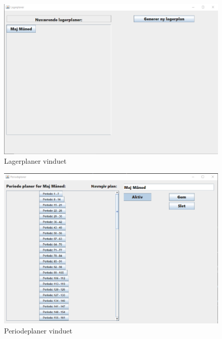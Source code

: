 \begin{figure}
    \centering
    \includegraphics[width=0.7\hsize]{figures/implementation/UI/lagerplaner.png}
    \caption{Lagerplaner vinduet}
    \label{fig:lagerplaner}
\end{figure}

\begin{figure}
    \centering
    \includegraphics[width=0.7\hsize]{figures/implementation/UI/periodeplaner.png}
    \caption{Periodeplaner vinduet}
    \label{fig:periodeplaner}
\end{figure}
